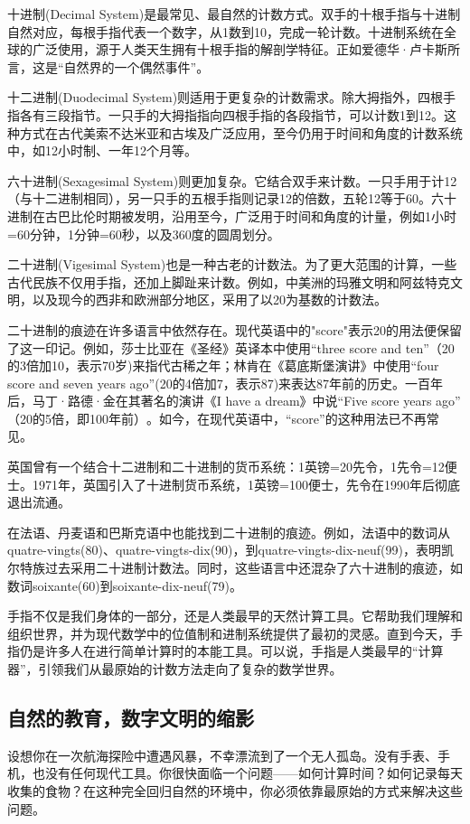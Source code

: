 十进制(Decimal System)是最常见、最自然的计数方式。双手的十根手指与十进制自然对应，每根手指代表一个数字，从1数到10，完成一轮计数。十进制系统在全球的广泛使用，源于人类天生拥有十根手指的解剖学特征。正如爱德华·卢卡斯所言，这是“自然界的一个偶然事件”​。

十二进制(Duodecimal System)则适用于更复杂的计数需求。除大拇指外，四根手指各有三段指节。一只手的大拇指指向四根手指的各段指节，可以计数1到12。这种方式在古代美索不达米亚和古埃及广泛应用，至今仍用于时间和角度的计数系统中，如12小时制、一年12个月等。

六十进制(Sexagesimal System)则更加复杂。它结合双手来计数。一只手用于计12（与十二进制相同），另一只手的五根手指则记录12的倍数，五轮12等于60。六十进制在古巴比伦时期被发明，沿用至今，广泛用于时间和角度的计量，例如1小时=60分钟，1分钟=60秒，以及360度的圆周划分。

二十进制(Vigesimal System)也是一种古老的计数法。为了更大范围的计算，一些古代民族不仅用手指，还加上脚趾来计数。例如，中美洲的玛雅文明和阿兹特克文明，以及现今的西非和欧洲部分地区，采用了以20为基数的计数法。

二十进制的痕迹在许多语言中依然存在。现代英语中的"score"表示20的用法便保留了这一印记。例如，莎士比亚在《圣经》英译本中使用“three score and ten”（20的3倍加10，表示70岁)来指代古稀之年；林肯在《葛底斯堡演讲》中使用“four score and seven years ago”(20的4倍加7，表示87)来表达87年前的历史。一百年后，马丁·路德·金在其著名的演讲《I have a dream》中说“Five score years ago”​（20的5倍，即100年前）​。如今，在现代英语中，“score”的这种用法已不再常见。

英国曾有一个结合十二进制和二十进制的货币系统：1英镑=20先令，1先令=12便士。1971年，英国引入了十进制货币系统，1英镑=100便士，先令在1990年后彻底退出流通。

在法语、丹麦语和巴斯克语中也能找到二十进制的痕迹。例如，法语中的数词从quatre-vingts(80)​、quatre-vingts-dix(90)​，到quatre-vingts-dix-neuf(99)，表明凯尔特族过去采用二十进制计数法。同时，这些语言中还混杂了六十进制的痕迹，如数词soixante(60)到soixante-dix-neuf(79)。

手指不仅是我们身体的一部分，还是人类最早的天然计算工具。它帮助我们理解和组织世界，并为现代数学中的位值制和进制系统提供了最初的灵感。直到今天，手指仍是许多人在进行简单计算时的本能工具。可以说，手指是人类最早的“计算器”，引领我们从最原始的计数方法走向了复杂的数学世界。

\subsection*{自然的教育，数字文明的缩影}
设想你在一次航海探险中遭遇风暴，不幸漂流到了一个无人孤岛。没有手表、手机，也没有任何现代工具。你很快面临一个问题——如何计算时间？如何记录每天收集的食物？在这种完全回归自然的环境中，你必须依靠最原始的方式来解决这些问题。

